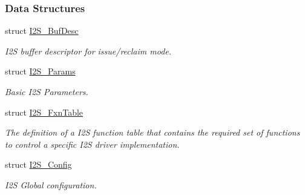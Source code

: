 \subsubsection*{Data Structures}
\begin{DoxyCompactItemize}
\item 
struct \hyperlink{struct_i2_s___buf_desc}{I2\+S\+\_\+\+Buf\+Desc}
\begin{DoxyCompactList}\small\item\em I2\+S buffer descriptor for issue/reclaim mode. \end{DoxyCompactList}\item 
struct \hyperlink{struct_i2_s___params}{I2\+S\+\_\+\+Params}
\begin{DoxyCompactList}\small\item\em Basic I2\+S Parameters. \end{DoxyCompactList}\item 
struct \hyperlink{struct_i2_s___fxn_table}{I2\+S\+\_\+\+Fxn\+Table}
\begin{DoxyCompactList}\small\item\em The definition of a I2\+S function table that contains the required set of functions to control a specific I2\+S driver implementation. \end{DoxyCompactList}\item 
struct \hyperlink{struct_i2_s___config}{I2\+S\+\_\+\+Config}
\begin{DoxyCompactList}\small\item\em I2\+S Global configuration. \end{DoxyCompactList}\end{DoxyCompactItemize}
